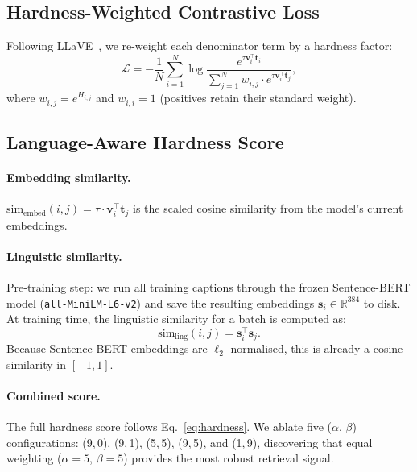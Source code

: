 \documentclass[10pt,twocolumn,letterpaper]{article}
\begin{document}
\subsection{Hardness-Weighted Contrastive Loss}

Following LLaVE~\cite{llave}, we re-weight each denominator term by a hardness factor:
\begin{equation}
  \mathcal{L} = -\frac{1}{N}\sum_{i=1}^{N} \log \frac{e^{\tau \mathbf{v}_i^\top \mathbf{t}_i}}{\sum_{j=1}^{N} w_{i,j} \cdot e^{\tau \mathbf{v}_i^\top \mathbf{t}_j}},
  \label{eq:weighted_loss}
\end{equation}
where $w_{i,j} = e^{H_{i,j}}$ and $w_{i,i} = 1$ (positives retain their standard weight).

\subsection{Language-Aware Hardness Score}

\paragraph{Embedding similarity.}
$\mathrm{sim}_\mathrm{embed}(i,j) = \tau \cdot \mathbf{v}_i^\top \mathbf{t}_j$ is the scaled cosine similarity from the model's current embeddings.

\paragraph{Linguistic similarity.}
Pre-training step: we run all training captions through the frozen Sentence-BERT model (\texttt{all-MiniLM-L6-v2}) and save the resulting embeddings $\mathbf{s}_i \in \mathbb{R}^{384}$ to disk.
At training time, the linguistic similarity for a batch is computed as:
\begin{equation}
  \mathrm{sim}_\mathrm{ling}(i,j) = \mathbf{s}_i^\top \mathbf{s}_j.
\end{equation}
Because Sentence-BERT embeddings are $\ell_2$-normalised, this is already a cosine similarity in $[-1,1]$.

\paragraph{Combined score.}
The full hardness score follows Eq.~\ref{eq:hardness}.
We ablate five ($\alpha$, $\beta$) configurations: (9,\,0), (9,\,1), (5,\,5), (9,\,5), and (1,\,9), discovering that equal weighting ($\alpha{=}5$, $\beta{=}5$) provides the most robust retrieval signal.
\end{document}
